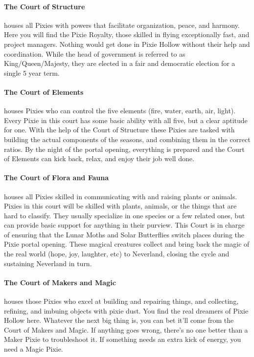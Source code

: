 \documentclass[blue]{PP}
\begin{document}
\paragraph{The Court of Structure} houses all Pixies with powers that facilitate organization, peace, and harmony. Here you will find the Pixie Royalty, those skilled in flying exceptionally fast, and project managers. Nothing would get done in Pixie Hollow without their help and coordination. While the head of government is referred to as King/Queen/Majesty, they are elected in a fair and democratic election for a single 5 year term.

\paragraph{The Court of Elements} houses Pixies who can control the five elements (fire, water, earth, air, light). Every Pixie in this court has some basic ability with all five, but a clear aptitude for one. With the help of the Court of Structure these Pixies are tasked with building the actual components of the seasons, and combining them in the correct ratios. By the night of the portal opening, everything is prepared and the Court of Elements can kick back, relax, and enjoy their job well done.

\paragraph{The Court of Flora and Fauna} houses all Pixies skilled in communicating with and raising plants or animals. Pixies in this court will be skilled with plants, animals, or the things that are hard to classify. They usually specialize in one species or a few related ones, but can provide basic support for anything in their purview. This Court is in charge of ensuring that the Lunar Moths and Solar Butterflies switch places during the Pixie portal opening. These magical creatures collect and bring back the magic of the real world (hope, joy, laughter, etc) to Neverland, closing the cycle and sustaining Neverland in turn.

\paragraph{The Court of Makers and Magic} houses those Pixies who excel at building and repairing  things, and collecting, refining, and imbuing objects with pixie dust. You find the real dreamers of Pixie Hollow here. Whatever the next big thing is, you can bet it’ll come from the Court of Makers and Magic. If anything goes wrong, there’s no one better than a Maker Pixie to troubleshoot it. If something needs an extra kick of energy, you need a Magic Pixie.
\end{document}
